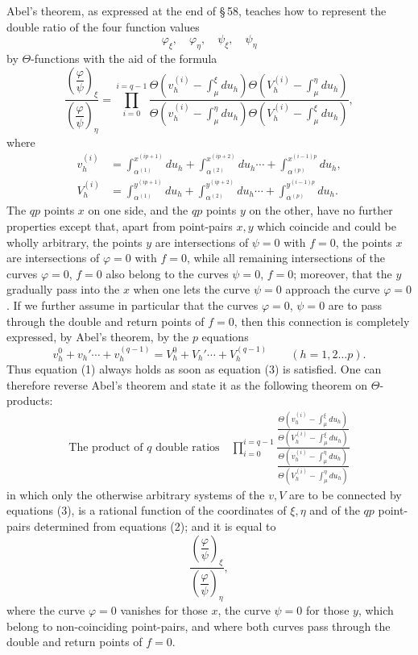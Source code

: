 \documentclass[10pt]{article}
\begin{document}
Abel's theorem, as expressed at the end of \S\,58, teaches how to represent the double ratio of the four function values
\[
\varphi_\xi,\quad \varphi_\eta,\quad \psi_\xi,\quad \psi_\eta
\]
by \(\Theta\)-functions with the aid of the formula
\[
\tag{1}
\frac{\left(\dfrac{\varphi}{\psi}\right)_{\xi}}
     {\left(\dfrac{\varphi}{\psi}\right)_{\eta}}
=
\prod_{i=0}^{i=q-1}
\frac{\Theta\left(v_h^{(i)}-\int_{\mu}^{\xi}du_h\right)
      \Theta\left(V_h^{(i)}-\int_{\mu}^{\eta}du_h\right)}
     {\Theta\left(v_h^{(i)}-\int_{\mu}^{\eta}du_h\right)
      \Theta\left(V_h^{(i)}-\int_{\mu}^{\xi}du_h\right)},
\]
where
\[
\tag{2}
\begin{aligned}
v_h^{(i)}&=\int_{\alpha^{(1)}}^{x^{(ip+1)}}du_h+
\int_{\alpha^{(2)}}^{x^{(ip+2)}}du_h\cdots+
\int_{\alpha^{(p)}}^{x^{(i-1)p}}du_h,\\
V_h^{(i)}&=\int_{\alpha^{(1)}}^{y^{(ip+1)}}du_h+
\int_{\alpha^{(2)}}^{y^{(ip+2)}}du_h\cdots+
\int_{\alpha^{(p)}}^{y^{(i-1)p}}du_h.
\end{aligned}
\]
The \(q p\) points \(x\) on one side, and the \(q p\) points \(y\) on the other, have no further properties except that, apart from point-pairs \(x,y\) which coincide and could be wholly arbitrary, the points \(y\) are intersections of \(\psi=0\) with \(f=0\), the points \(x\) are intersections of \(\varphi=0\) with \(f=0\), while all remaining intersections of the curves \(\varphi=0\), \(f=0\) also belong to the curves \(\psi=0\), \(f=0\); moreover, that the \(y\) gradually pass into the \(x\) when one lets the curve \(\psi=0\) approach the curve \(\varphi=0\). If we further assume in particular that the curves \(\varphi=0\), \(\psi=0\) are to pass through the double and return points of \(f=0\), then this connection is completely expressed, by Abel's theorem, by the \(p\) equations
\[
\tag{3}
 v_h^0+v_h'\cdots+v_h^{(q-1)}=V_h^0+V_h'\cdots+V_h^{(q-1)}
 \qquad(h=1,2\ldots p).
\]
Thus equation (1) always holds as soon as equation (3) is satisfied. One can therefore reverse Abel's theorem and state it as the following theorem on \(\Theta\)-products:
\[
\begin{gathered}
\text{The product of }q\text{ double ratios}\quad
\prod_{i=0}^{i=q-1}
\frac{\dfrac{\Theta\left(v_h^{(i)}-\int_{\mu}^{\xi}du_h\right)}
              {\Theta\left(V_h^{(i)}-\int_{\mu}^{\xi}du_h\right)}}
     {\dfrac{\Theta\left(v_h^{(i)}-\int_{\mu}^{\eta}du_h\right)}
              {\Theta\left(V_h^{(i)}-\int_{\mu}^{\eta}du_h\right)}}
\end{gathered}
\]
in which only the otherwise arbitrary systems of the \(v,V\) are to be connected by equations (3), is a rational function of the coordinates of \(\xi,\eta\) and of the \(q p\) point-pairs determined from equations (2); and it is equal to
\[
\frac{\left(\dfrac{\varphi}{\psi}\right)_{\xi}}
     {\left(\dfrac{\varphi}{\psi}\right)_{\eta}},
\]
where the curve \(\varphi=0\) vanishes for those \(x\), the curve \(\psi=0\) for those \(y\), which belong to non-coinciding point-pairs, and where both curves pass through the double and return points of \(f=0\).
\end{document}
